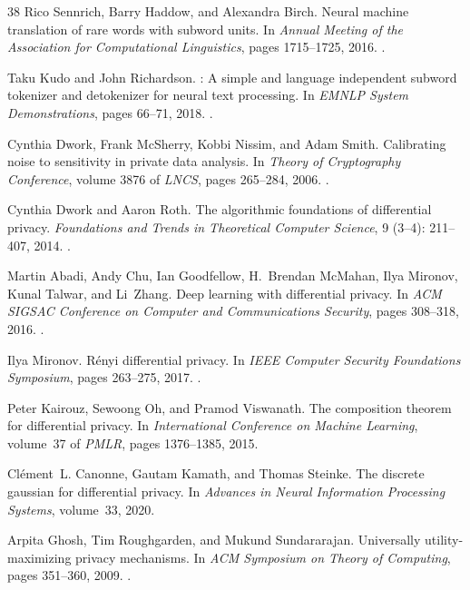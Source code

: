 \begin{thebibliography}{38}
Rico Sennrich, Barry Haddow, and Alexandra Birch.
\newblock Neural machine translation of rare words with subword units.
\newblock In \emph{Annual Meeting of the Association for Computational
  Linguistics}, pages 1715--1725, 2016.
\newblock {}.

Taku Kudo and John Richardson.
: A simple and language independent subword tokenizer
  and detokenizer for neural text processing.
\newblock In \emph{EMNLP System Demonstrations}, pages 66--71, 2018.
\newblock {}.

Cynthia Dwork, Frank McSherry, Kobbi Nissim, and Adam Smith.
\newblock Calibrating noise to sensitivity in private data analysis.
\newblock In \emph{Theory of Cryptography Conference}, volume 3876 of
  \emph{LNCS}, pages 265--284, 2006.
\newblock {}.

Cynthia Dwork and Aaron Roth.
\newblock The algorithmic foundations of differential privacy.
\newblock \emph{Foundations and Trends in Theoretical Computer Science},
  9 (3--4): 211--407, 2014.
\newblock {}.

Martin Abadi, Andy Chu, Ian Goodfellow, H.~Brendan McMahan, Ilya Mironov, Kunal
  Talwar, and Li~Zhang.
\newblock Deep learning with differential privacy.
\newblock In \emph{ACM SIGSAC Conference on Computer and Communications
  Security}, pages 308--318, 2016.
\newblock {}.

Ilya Mironov.
\newblock R{\'e}nyi differential privacy.
\newblock In \emph{IEEE Computer Security Foundations Symposium}, pages
  263--275, 2017.
\newblock {}.

Peter Kairouz, Sewoong Oh, and Pramod Viswanath.
\newblock The composition theorem for differential privacy.
\newblock In \emph{International Conference on Machine Learning}, volume~37 of
  \emph{PMLR}, pages 1376--1385, 2015.

Cl{\'e}ment~L. Canonne, Gautam Kamath, and Thomas Steinke.
\newblock The discrete gaussian for differential privacy.
\newblock In \emph{Advances in Neural Information Processing Systems},
  volume~33, 2020.

Arpita Ghosh, Tim Roughgarden, and Mukund Sundararajan.
\newblock Universally utility-maximizing privacy mechanisms.
\newblock In \emph{ACM Symposium on Theory of Computing}, pages 351--360, 2009.
\newblock {}.


\end{thebibliography}
